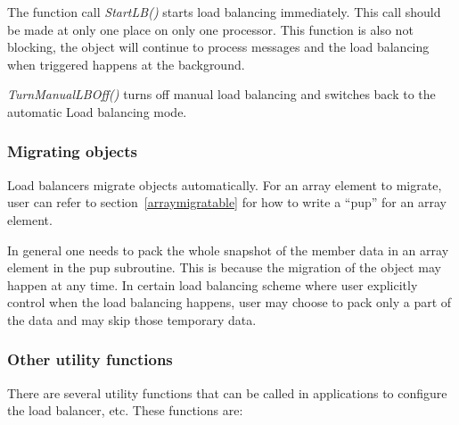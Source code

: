 \begin{enumerate}
The function call {\em StartLB()} starts load balancing immediately. This call
should be made at only one place on only one processor. This function is also
not blocking, the object will continue to process messages and the load
balancing when triggered happens at the background.

{\em TurnManualLBOff()} turns off manual load balancing and switches back to
the automatic Load balancing mode.
%
\end{enumerate}

\subsubsection{Migrating objects}

\label{lbmigobj}

Load balancers migrate objects automatically.
For an array element to migrate, user can refer to section~\ref{arraymigratable}
for how to write a ``pup'' for an array element.

In general one needs to pack the whole snapshot of the member data in an 
array element in the pup subroutine. This is because the migration of
the object may happen at any time. In certain load balancing scheme where
user explicitly control when the load balancing happens, user may choose
to pack only a part of the data and may skip those temporary data.

\subsubsection{Other utility functions}

There are several utility functions that can be called in applications to
configure the load balancer, etc. These functions are:

